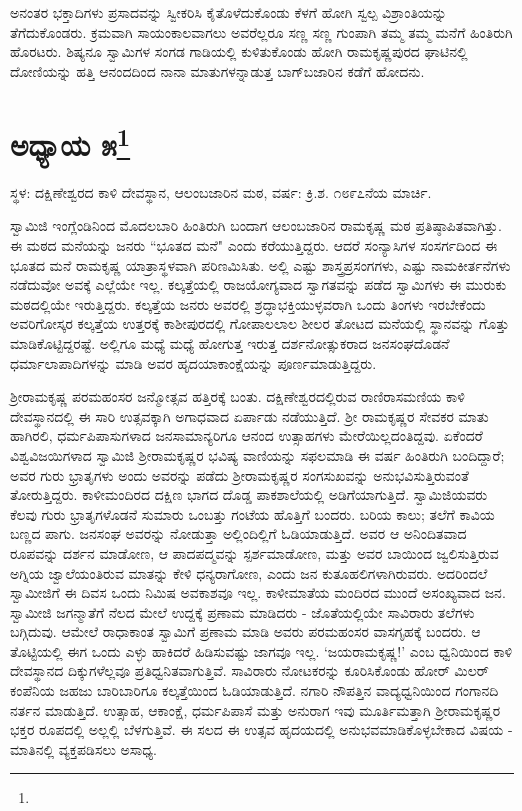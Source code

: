 ಅನಂತರ ಭಕ್ತಾದಿಗಳು ಪ್ರಸಾದವನ್ನು ಸ್ವೀಕರಿಸಿ ಕೈತೊಳೆದುಕೊಂಡು ಕೆಳಗೆ ಹೋಗಿ ಸ್ವಲ್ಪ ವಿಶ್ರಾಂತಿಯನ್ನು ತೆಗೆದುಕೊಂಡರು. ಕ್ರಮವಾಗಿ ಸಾಯಂಕಾಲವಾಗಲು ಅವರೆಲ್ಲರೂ ಸಣ್ಣ ಸಣ್ಣ ಗುಂಪಾಗಿ ತಮ್ಮ ತಮ್ಮ ಮನೆಗೆ ಹಿಂತಿರುಗಿ ಹೊರಟರು. ಶಿಷ್ಯನೂ ಸ್ವಾಮಿಗಳ ಸಂಗಡ ಗಾಡಿಯಲ್ಲಿ ಕುಳಿತುಕೊಂಡು ಹೋಗಿ ರಾಮಕೃಷ್ಣಪುರದ ಘಾಟಿನಲ್ಲಿ ದೋಣಿಯನ್ನು ಹತ್ತಿ ಆನಂದದಿಂದ ನಾನಾ ಮಾತುಗಳನ್ನಾಡುತ್ತ ಬಾಗ್‌ಬಜಾರಿನ ಕಡೆಗೆ ಹೋದನು.

\newpage

\chapter[ಅಧ್ಯಾಯ ೫]{ಅಧ್ಯಾಯ ೫\protect\footnote{}}

\begin{center}
ಸ್ಥಳ: ದಕ್ಷಿಣೇಶ್ವರದ ಕಾಳಿ ದೇವಸ್ಥಾನ, ಆಲಂಬಜಾರಿನ ಮಠ, ವರ್ಷ: ಕ್ರಿ.ಶ. ೧೮೯೭ನೆಯ ಮಾರ್ಚಿ.
\end{center}

ಸ್ವಾಮಿಜಿ ಇಂಗ್ಲೆಂಡಿನಿಂದ ಮೊದಲಬಾರಿ ಹಿಂತಿರುಗಿ ಬಂದಾಗ ಆಲಂಬಜಾರಿನ ರಾಮಕೃಷ್ಣ ಮಠ ಪ್ರತಿಷ್ಠಾಪಿತವಾಗಿತ್ತು. ಈ ಮಠದ ಮನೆಯನ್ನು ಜನರು “ಭೂತದ ಮನೆ" ಎಂದು ಕರೆಯುತ್ತಿದ್ದರು. ಆದರೆ ಸಂನ್ಯಾಸಿಗಳ ಸಂಸರ್ಗದಿಂದ ಈ ಭೂತದ ಮನೆ ರಾಮಕೃಷ್ಣ ಯಾತ್ರಾಸ್ಥಳವಾಗಿ ಪರಿಣಮಿಸಿತು. ಅಲ್ಲಿ ಎಷ್ಟು ಶಾಸ್ತ್ರಪ್ರಸಂಗಗಳು, ಎಷ್ಟು ನಾಮಕೀರ್ತನೆಗಳು ನಡೆದುವೋ ಅವಕ್ಕೆ ಎಲ್ಲೆಯೇ ಇಲ್ಲ. ಕಲ್ಕತ್ತೆಯಲ್ಲಿ ರಾಜಯೋಗ್ಯವಾದ ಸ್ವಾಗತವನ್ನು ಪಡೆದ ಸ್ವಾಮಿಗಳು ಈ ಮುರುಕು ಮಠದಲ್ಲಿಯೇ ಇರುತ್ತಿದ್ದರು. ಕಲ್ಕತ್ತೆಯ ಜನರು ಅವರಲ್ಲಿ ಶ್ರದ್ಧಾಭಕ್ತಿಯುಳ್ಳವರಾಗಿ ಒಂದು ತಿಂಗಳು ಇರಬೇಕೆಂದು ಅವರಿಗೋಸ್ಕರ ಕಲ್ಕತ್ತೆಯ ಉತ್ತರಕ್ಕೆ ಕಾಶೀಪುರದಲ್ಲಿ ಗೋಪಾಲಲಾಲ ಶೀಲರ ತೋಟದ ಮನೆಯಲ್ಲಿ ಸ್ಥಾನವನ್ನು ಗೊತ್ತು ಮಾಡಿಕೊಟ್ಟಿದ್ದರಷ್ಟೆ. ಅಲ್ಲಿಗೂ ಮಧ್ಯೆ ಮಧ್ಯೆ ಹೋಗುತ್ತ ಇರುತ್ತ ದರ್ಶನೋತ್ಸುಕರಾದ ಜನಸಂಘದೊಡನೆ ಧರ್ಮಾಲಾಪಾದಿಗಳನ್ನು ಮಾಡಿ ಅವರ ಹೃದಯಾಕಾಂಕ್ಷೆಯನ್ನು ಪೂರ್ಣಮಾಡುತ್ತಿದ್ದರು.

ಶ‍್ರೀರಾಮಕೃಷ್ಣ ಪರಮಹಂಸರ ಜನ್ಮೋತ್ಸವ ಹತ್ತಿರಕ್ಕೆ ಬಂತು. ದಕ್ಷಿಣೇಶ್ವರದಲ್ಲಿರುವ ರಾಣಿರಾಸಮಣಿಯ ಕಾಳಿ ದೇವಸ್ಥಾನದಲ್ಲಿ ಈ ಸಾರಿ ಉತ್ಸವಕ್ಕಾಗಿ ಅಗಾಧವಾದ ಏರ್ಪಾಡು ನಡೆಯುತ್ತಿದೆ. ಶ‍್ರೀ ರಾಮಕೃಷ್ಣರ ಸೇವಕರ ಮಾತು ಹಾಗಿರಲಿ, ಧರ್ಮಪಿಪಾಸುಗಳಾದ ಜನಸಾಮಾನ್ಯರಿಗೂ ಆನಂದ ಉತ್ಸಾಹಗಳು ಮೇರೆಯಿಲ್ಲದಂತಿದ್ದವು. ಏಕೆಂದರೆ ವಿಶ್ವವಿಜಯಿಗಳಾದ ಸ್ವಾಮಿಜಿ ಶ‍್ರೀರಾಮಕೃಷ್ಣರ ಭವಿಷ್ಯ ವಾಣಿಯನ್ನು ಸಫಲಮಾಡಿ ಈ ವರ್ಷ ಹಿಂತಿರುಗಿ ಬಂದಿದ್ದಾರೆ; ಅವರ ಗುರು ಭ್ರಾತೃಗಳು ಅಂದು ಅವರನ್ನು ಪಡೆದು ಶ‍್ರೀರಾಮಕೃಷ್ಣರ ಸಂಗಸುಖವನ್ನು ಅನುಭವಿಸುತ್ತಿರುವಂತೆ ತೋರುತ್ತಿದ್ದರು. ಕಾಳೀಮಂದಿರದ ದಕ್ಷಿಣ ಭಾಗದ ದೊಡ್ಡ ಪಾಕಶಾಲೆಯಲ್ಲಿ ಅಡಿಗೆಯಾಗುತ್ತಿದೆ. ಸ್ವಾಮಿಜಿಯವರು ಕೆಲವು ಗುರು ಭ್ರಾತೃಗಳೊಡನೆ ಸುಮಾರು ಒಂಬತ್ತು ಗಂಟೆಯ ಹೊತ್ತಿಗೆ ಬಂದರು. ಬರಿಯ ಕಾಲು; ತಲೆಗೆ ಕಾವಿಯ ಬಣ್ಣದ ಪಾಗು. ಜನಸಂಘ ಅವರನ್ನು ನೋಡುತ್ತಾ ಅಲ್ಲಿಂದಿಲ್ಲಿಗೆ ಓಡಿಯಾಡುತ್ತಿದೆ. ಅವರ ಆ ಅನಿಂದಿತವಾದ ರೂಪವನ್ನು ದರ್ಶನ ಮಾಡೋಣ, ಆ ಪಾದಪದ್ಮವನ್ನು ಸ್ಪರ್ಶಮಾಡೋಣ, ಮತ್ತು ಅವರ ಬಾಯಿಂದ ಜ್ವಲಿಸುತ್ತಿರುವ ಅಗ್ನಿಯ ಜ್ವಾಲೆಯಂತಿರುವ ಮಾತನ್ನು ಕೇಳಿ ಧನ್ಯರಾಗೋಣ, ಎಂದು ಜನ ಕುತೂಹಲಿಗಳಾಗಿರುವರು. ಅದರಿಂದಲೆ ಸ್ವಾಮೀಜಿಗೆ ಈ ದಿವಸ ಒಂದು ನಿಮಿಷ ಅವಕಾಶವೂ ಇಲ್ಲ. ಕಾಳೀಮಾತೆಯ ಮಂದಿರದ ಮುಂದೆ ಅಸಂಖ್ಯವಾದ ಜನ. ಸ್ವಾಮೀಜಿ ಜಗನ್ಮಾತೆಗೆ ನೆಲದ ಮೇಲೆ ಉದ್ದಕ್ಕೆ ಪ್ರಣಾಮ ಮಾಡಿದರು - ಜೊತೆಯಲ್ಲಿಯೇ ಸಾವಿರಾರು ತಲೆಗಳು ಬಗ್ಗಿದುವು. ಆಮೇಲೆ ರಾಧಾಕಾಂತ ಸ್ವಾಮಿಗೆ ಪ್ರಣಾಮ ಮಾಡಿ ಅವರು ಪರಮಹಂಸರ ವಾಸಗೃಹಕ್ಕೆ ಬಂದರು. ಆ ತೊಟ್ಟಿಯಲ್ಲಿ ಈಗ ಒಂದು ಎಳ್ಳು ಹಾಕಿದರೆ ಹಿಡಿಸುವಷ್ಟು ಜಾಗವೂ ಇಲ್ಲ. ‘ಜಯರಾಮಕೃಷ್ಣ!’ ಎಂಬ ಧ್ವನಿಯಿಂದ ಕಾಳಿ ದೇವಸ್ಥಾನದ ದಿಕ್ಕುಗಳೆಲ್ಲವೂ ಪ್ರತಿಧ್ವನಿತವಾಗುತ್ತಿವೆ. ಸಾವಿರಾರು ನೋಟಕರನ್ನು ಕೂರಿಸಿಕೊಂಡು ಹೋರ್‌ ಮಿಲರ್ ಕಂಪೆನಿಯ ಜಹಜು ಬಾರಿಬಾರಿಗೂ ಕಲ್ಕತ್ತೆಯಿಂದ ಓಡಿಯಾಡುತ್ತಿದೆ. ನಗಾರಿ ನೌಪತ್ತಿನ ವಾದ್ಯಧ್ವನಿಯಿಂದ ಗಂಗಾನದಿ ನರ್ತನ ಮಾಡುತ್ತಿದೆ. ಉತ್ಸಾಹ, ಆಕಾಂಕ್ಷೆ, ಧರ್ಮಪಿಪಾಸೆ ಮತ್ತು ಅನುರಾಗ ಇವು ಮೂರ್ತಿಮತ್ತಾಗಿ ಶ‍್ರೀರಾಮಕೃಷ್ಣರ ಭಕ್ತರ ರೂಪದಲ್ಲಿ ಅಲ್ಲಲ್ಲಿ ಬೆಳಗುತ್ತಿವೆ. ಈ ಸಲದ ಈ ಉತ್ಸವ ಹೃದಯದಲ್ಲಿ ಅನುಭವಮಾಡಿಕೊಳ್ಳಬೇಕಾದ ವಿಷಯ - ಮಾತಿನಲ್ಲಿ ವ್ಯಕ್ತಪಡಿಸಲು ಅಸಾಧ್ಯ.

